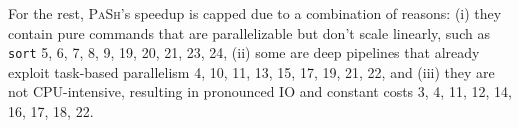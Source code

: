 \documentclass[sigplan, review, screen, anonymous]{acmart}
\newcommand{\ttt}[1]{\texttt{#1}}
\newcommand{\todo}[1]{\hl{#1}\xspace}
\newcommand{\kk}[1]{[{\color{magenta}kk: #1}]}
\newcommand{\sys}{{\scshape PaSh}\xspace}
\begin{document}
% 
% 
% 


For the rest, \sys's speedup is capped due to a combination of reasons:
  (i) they contain pure commands that are parallelizable but don't scale linearly, such as \ttt{sort} 
  5, 6, 7, 8, 9, 19, 20, 21, 23, 24,
  (ii) some are deep pipelines that already exploit task-based parallelism 
  4, 10, 11, 13, 15, 17, 19, 21, 22,
  and
  (iii) they are not CPU-intensive, resulting in pronounced IO and constant costs 
  3, 4, 11, 12, 14, 16, 17, 18, 22.




\end{document}
